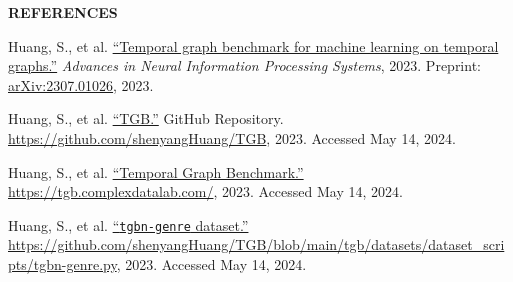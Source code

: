 \documentclass[10pt, letterpaper]{article}
\renewcommand{\section}[1]{%
	    \vspace{\parskip}
		{\large \bfseries\uppercase{#1}}
}
\begin{document}

\section{References}

\begingroup

\renewcommand{\section}[2]{}%

\begin{thebibliography}{3}
	
Huang, S., et al.
\href{https://doi.org/10.48550/arXiv.2307.01026}
{``Temporal graph benchmark for machine learning on temporal graphs.''} {\em Advances in Neural Information Processing Systems}, 2023. Preprint: \url{arXiv:2307.01026}, 2023.
	
Huang, S., et al. 
\href{https://github.com/shenyangHuang/TGB}
{``TGB.''}
GitHub Repository. \url{https://github.com/shenyangHuang/TGB}, 2023. 
Accessed May 14, 2024.

Huang, S., et al.
\href{https://tgb.complexdatalab.com/}
{``Temporal Graph Benchmark.''}
\url{https://tgb.complexdatalab.com/}, 2023.
Accessed May 14, 2024.

Huang, S., et al.
\href{https://github.com/shenyangHuang/TGB/blob/main/tgb/datasets/dataset_scripts/tgbn-genre.py}
{``{\tt{tgbn-genre}} dataset.''}
\url{https://github.com/shenyangHuang/TGB/blob/main/tgb/datasets/dataset_scripts/tgbn-genre.py},
 2023. 
Accessed May 14, 2024.
	
\end{thebibliography}

\endgroup	
	
\end{document}
